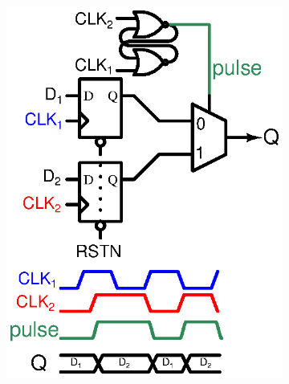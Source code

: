 \begin{figure}[htp]
	\centering
	\begin{subfigure}[b]{0.48\textwidth}
		\includegraphics[width=\textwidth]{Chapter4/Figs/det-dff-solution1.ps}
		\label{fig:solution-1}
	\end{subfigure}
	\begin{subfigure}[b]{0.48\textwidth}

\end{subfigure}
\end{figure}
